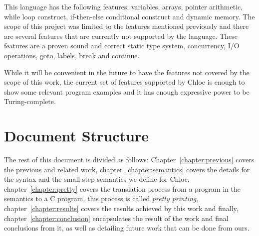 This language has the following features: variables, arrays, pointer arithmetic, while loop construct, if-then-else conditional construct and dynamic memory.
The scope of this project was limited to the features mentioned previously and there are several features that are currently not supported by the language.
These features are a proven sound and correct static type system, concurrency, I/O operations, goto, labels, break and continue.

While it will be convenient in the future to have the features not covered by the scope of this work, the current set of features supported by Chloe is enough to show some relevant program examples and it has enough expressive power to be Turing-complete.


\section{Document Structure}\label{section:document_structure}

The rest of this document is divided as follows: Chapter~\ref{chapter:previous} covers the previous and related work, chapter~\ref{chapter:semantics} covers the details for the syntax and the small-step semantics we define for Chloe, chapter~\ref{chapter:pretty} covers the translation process from a program in the semantics to a C program, this process is called \textit{pretty printing}, chapter~\ref{chapter:results} covers the results achieved by this work and finally, chapter~\ref{chapter:conclusion} encapsulates the result of the work and final conclusions from it, as well as detailing future work that can be done from ours.
